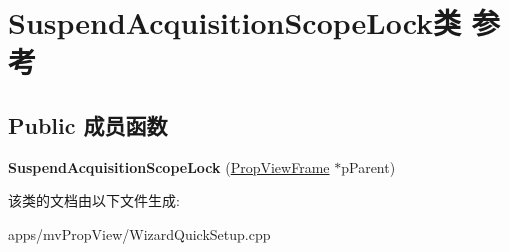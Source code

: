 \hypertarget{class_suspend_acquisition_scope_lock}{\section{Suspend\+Acquisition\+Scope\+Lock类 参考}
\label{class_suspend_acquisition_scope_lock}
}
\subsection*{Public 成员函数}
\begin{DoxyCompactItemize}
\item 
\hypertarget{class_suspend_acquisition_scope_lock_abe9062463604a2d95b5dbcdb7c0cfbf7}{{\bfseries Suspend\+Acquisition\+Scope\+Lock} (\hyperlink{class_prop_view_frame}{Prop\+View\+Frame} $\ast$p\+Parent)}\label{class_suspend_acquisition_scope_lock_abe9062463604a2d95b5dbcdb7c0cfbf7}

\end{DoxyCompactItemize}


该类的文档由以下文件生成\+:\begin{DoxyCompactItemize}
\item 
apps/mv\+Prop\+View/Wizard\+Quick\+Setup.\+cpp\end{DoxyCompactItemize}
